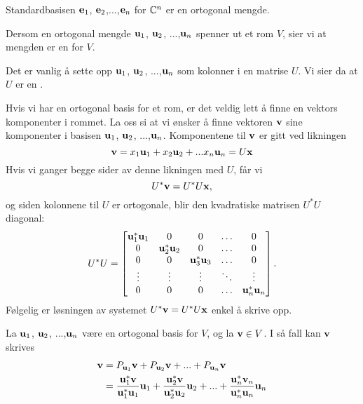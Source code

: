 \begin{ex}
Standardbasisen $\mathbf{e}_1$, $\mathbf{e}_2$,...,$\mathbf{e}_n$ for $\mathbb{C}^n$ er en ortogonal mengde.
\end{ex}

\begin{defnx}
Dersom en ortogonal mengde $\mathbf{u}_1$, $\mathbf{u} _2$, ...,$\mathbf{u}_n$ spenner ut et rom $V$, sier vi at mengden er en  for $V$.
\end{defnx}
\begin{defnx}
Det er vanlig å sette opp $\mathbf{u}_1$, $\mathbf{u} _2$, ...,$\mathbf{u}_n$ som kolonner i en matrise $U$. Vi sier da at $U$ er en .
\end{defnx}
%
%

Hvis vi har en ortogonal basis for et rom, er det veldig lett å finne en vektors komponenter i rommet. La oss si at vi ønsker å finne vektoren $\mathbf{v}$ sine komponenter i basisen $\mathbf{u}_1$, $\mathbf{u} _2$, ...,$\mathbf{u}_n$. Komponentene til $\mathbf{v}$ er gitt ved likningen 
\[
\mathbf{v} = x_1 \mathbf{u}_1 + x_2 \mathbf{u}_2 + ...x_n \mathbf{u}_n = U\mathbf{x}
\]
Hvis vi ganger begge sider av denne likningen med $U$, får vi
\[
U^* \mathbf{v} = U^*U\mathbf{x},
\]
og siden kolonnene til $U$ er ortogonale, blir den kvadratiske matrisen $U^*U$ diagonal:
\[
U^*U=
\begin{bmatrix}
\mathbf{u}_1^*\mathbf{u}_1 & 0 & 0 & \hdots & 0 \\
0 & \mathbf{u}_2^*\mathbf{u}_2 & 0 & \hdots & 0 \\
0 & 0 & \mathbf{u}_3^*\mathbf{u}_3  & \hdots & 0 \\
\vdots & \vdots & \vdots & \ddots & \vdots\\
0 & 0 & 0 & \hdots & \mathbf{u}_n^*\mathbf{u}_n
\end{bmatrix}.
\]
Følgelig er løsningen av systemet $U^* \mathbf{v} = U^*U\mathbf{x}$ enkel å skrive opp. 
\begin{thm}
La $\mathbf{u}_1$, $\mathbf{u} _2$, ...,$\mathbf{u}_n$ være en ortogonal basis for $V$, og la $\mathbf{v} \in V$. 
I så fall kan $\mathbf{v}$ skrives
\begin{align*}
\mathbf{v}&= P_{\mathbf{u}_1} \mathbf{v} + P_{\mathbf{u}_2} \mathbf{v} + ... +P_{\mathbf{u}_n} \mathbf{v}\\ &= \frac{\mathbf{u}_1^*\mathbf{v}}{\mathbf{u}_1^*\mathbf{u}_1}\mathbf{u}_1 + \frac{\mathbf{u}_2^*\mathbf{v}}{\mathbf{u}_2^*\mathbf{u}_2}\mathbf{u}_2+...+\frac{\mathbf{u}_n^*\mathbf{v}_n}{\mathbf{u}_n^*\mathbf{u}_n}\mathbf{u}_n
\end{align*}
\end{thm}



